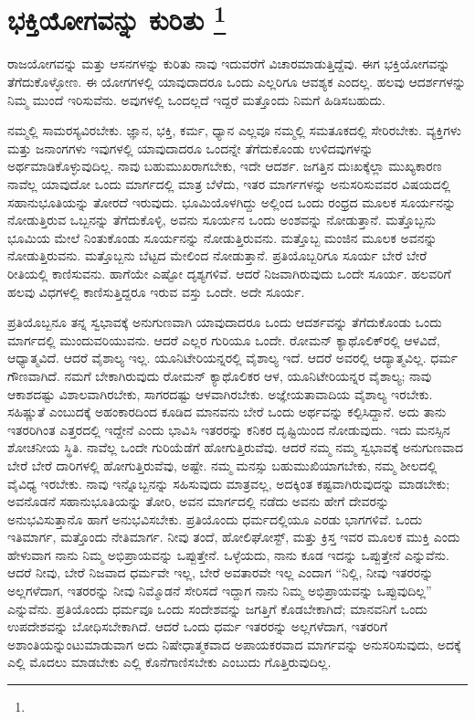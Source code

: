 
\chapter[ಭಕ್ತಿಯೋಗವನ್ನು ಕುರಿತು ]{ಭಕ್ತಿಯೋಗವನ್ನು ಕುರಿತು \protect\footnote{}}

ರಾಜಯೋಗವನ್ನು ಮತ್ತು ಆಸನಗಳನ್ನು ಕುರಿತು ನಾವು ಇದುವರೆಗೆ ವಿಚಾರಮಾಡುತ್ತಿದ್ದೆವು. ಈಗ ಭಕ್ತಿಯೋಗವನ್ನು ತೆಗೆದುಕೊಳ್ಳೋಣ. ಈ ಯೋಗಗಳಲ್ಲಿ ಯಾವುದಾದರೂ ಒಂದು ಎಲ್ಲರಿಗೂ ಆವಶ್ಯಕ ಎಂದಲ್ಲ. ಹಲವು ಆದರ್ಶಗಳನ್ನು ನಿಮ್ಮ ಮುಂದೆ ಇರಿಸುವೆನು. ಅವುಗಳಲ್ಲಿ ಒಂದಲ್ಲದೆ ಇದ್ದರೆ ಮತ್ತೊಂದು ನಿಮಗೆ ಹಿಡಿಸಬಹುದು.

ನಮ್ಮಲ್ಲಿ ಸಾಮರಸ್ಯವಿರಬೇಕು. ಜ್ಞಾನ, ಭಕ್ತಿ, ಕರ್ಮ, ಧ್ಯಾನ ಎಲ್ಲವೂ ನಮ್ಮಲ್ಲಿ ಸಮತೂಕದಲ್ಲಿ ಸೇರಿರಬೇಕು. ವ್ಯಕ್ತಿಗಳು ಮತ್ತು ಜನಾಂಗಗಳು ಇವುಗಳಲ್ಲಿ ಯಾವುದಾದರೂ ಒಂದನ್ನೇ ತೆಗೆದುಕೊಂಡು ಉಳಿದವುಗಳನ್ನು ಅರ್ಥಮಾಡಿಕೊಳ್ಳುವುದಿಲ್ಲ. ನಾವು ಬಹುಮುಖರಾಗಬೇಕು, ಇದೇ ಆದರ್ಶ. ಜಗತ್ತಿನ ದುಃಖಕ್ಕೆಲ್ಲಾ ಮುಖ್ಯಕಾರಣ ನಾವೆಲ್ಲ ಯಾವುದೋ ಒಂದು ಮಾರ್ಗದಲ್ಲಿ ಮಾತ್ರ ಬೆಳೆದು, ಇತರ ಮಾರ್ಗಗಳನ್ನು ಅನುಸರಿಸುವವರ ವಿಷಯದಲ್ಲಿ ಸಹಾನುಭೂತಿಯನ್ನು ತೋರದೆ ಇರುವುದು. ಭೂಮಿಯೊಳಗಿದ್ದು ಅಲ್ಲಿಂದ ಒಂದು ರಂಧ್ರದ ಮೂಲಕ ಸೂರ್ಯನನ್ನು ನೋಡುತ್ತಿರುವ ಒಬ್ಬನನ್ನು ತೆಗೆದುಕೊಳ್ಳಿ, ಅವನು ಸೂರ್ಯನ ಒಂದು ಅಂಶವನ್ನು ನೋಡುತ್ತಾನೆ. ಮತ್ತೊಬ್ಬನು ಭೂಮಿಯ ಮೇಲೆ ನಿಂತುಕೊಂಡು ಸೂರ್ಯನನ್ನು ನೋಡುತ್ತಿರುವನು. ಮತ್ತೊಬ್ಬ ಮಂಜಿನ ಮೂಲಕ ಅವನನ್ನು ನೋಡುತ್ತಿರುವನು. ಮತ್ತೊಬ್ಬನು ಬೆಟ್ಟದ ಮೇಲಿಂದ ನೋಡುತ್ತಾನೆ. ಪ್ರತಿಯೊಬ್ಬರಿಗೂ ಸೂರ್ಯ ಬೇರೆ ಬೇರೆ ರೀತಿಯಲ್ಲಿ ಕಾಣಿಸುವನು. ಹಾಗೆಯೇ ಎಷ್ಟೋ ದೃಶ್ಯಗಳಿವೆ. ಆದರೆ ನಿಜವಾಗಿರುವುದು ಒಂದೇ ಸೂರ್ಯ. ಹಲವರಿಗೆ ಹಲವು ವಿಧಗಳಲ್ಲಿ ಕಾಣಿಸುತ್ತಿದ್ದರೂ ಇರುವ ವಸ್ತು ಒಂದೇ. ಅದೇ ಸೂರ್ಯ.

ಪ್ರತಿಯೊಬ್ಬನೂ ತನ್ನ ಸ್ವಭಾವಕ್ಕೆ ಅನುಗುಣವಾಗಿ ಯಾವುದಾದರೂ ಒಂದು ಆದರ್ಶವನ್ನು ತೆಗೆದುಕೊಂಡು ಒಂದು ಮಾರ್ಗದಲ್ಲಿ ಮುಂದುವರಿಯುವನು. ಆದರೆ ಎಲ್ಲರ ಗುರಿಯೂ ಒಂದೇ. ರೋಮನ್​ ಕ್ಯಾಥೊಲಿಕ್​ರಲ್ಲಿ ಆಳವಿದೆ, ಆಧ್ಯಾತ್ಮವಿದೆ. ಆದರೆ ವೈಶಾಲ್ಯ ಇಲ್ಲ. ಯೂನಿಟೇರಿಯನ್ನರಲ್ಲಿ ವೈಶಾಲ್ಯ ಇದೆ. ಆದರೆ ಅವರಲ್ಲಿ ಆದ್ಯಾತ್ಮವಿಲ್ಲ. ಧರ್ಮ ಗೌಣವಾಗಿದೆ. ನಮಗೆ ಬೇಕಾಗಿರುವುದು ರೋಮನ್​ ಕ್ಯಾಥೊಲಿಕರ ಆಳ, ಯೂನಿಟೇರಿಯನ್ನರ ವೈಶಾಲ್ಯ; ನಾವು ಆಕಾಶದಷ್ಟು ವಿಶಾಲವಾಗಿರಬೇಕು, ಸಾಗರದಷ್ಟು ಆಳವಾಗಿರಬೇಕು. ಅಜ್ಞೇಯತಾವಾದಿಯ ವೈಶಾಲ್ಯ ಇರಬೇಕು. ಸಹಿಷ್ಣುತೆ ಎಂಬುದಕ್ಕೆ ಅಹಂಕಾರದಿಂದ ಕೂಡಿದ ಮಾನವನು ಬೇರೆ ಒಂದು ಅರ್ಥವನ್ನು ಕಲ್ಪಿಸಿದ್ದಾನೆ. ಅದು ತಾನು ಇತರರಿಗಿಂತ ಎತ್ತರದಲ್ಲಿ ಇದ್ದೇನೆ ಎಂದು ಭಾವಿಸಿ ಇತರರನ್ನು ಕನಿಕರ ದೃಷ್ಟಿಯಿಂದ ನೋಡುವುದು. ಇದು ಮನಸ್ಸಿನ ಶೋಚನೀಯ ಸ್ಥಿತಿ. ನಾವೆಲ್ಲ ಒಂದೇ ಗುರಿಯೆಡೆಗೆ ಹೋಗುತ್ತಿರುವೆವು. ಆದರೆ ನಮ್ಮ ನಮ್ಮ ಸ್ವಭಾವಕ್ಕೆ ಅನುಗುಣವಾದ ಬೇರೆ ಬೇರೆ ದಾರಿಗಳಲ್ಲಿ ಹೋಗುತ್ತಿರುವೆವು, ಅಷ್ಟೇ. ನಮ್ಮ ಮನಸ್ಸು ಬಹುಮುಖಿಯಾಗಬೇಕು, ನಮ್ಮ ಶೀಲದಲ್ಲಿ ವೈವಿಧ್ಯ ಇರಬೇಕು. ನಾವು ಇನ್ನೊಬ್ಬನನ್ನು ಸಹಿಸುವುದು ಮಾತ್ರವಲ್ಲ, ಅದಕ್ಕಿಂತ ಕಷ್ಟವಾಗಿರುವುದನ್ನು ಮಾಡಬೇಕು; ಅವನೊಡನೆ ಸಹಾನುಭೂತಿಯನ್ನು ತೋರಿ, ಅವನ ಮಾರ್ಗದಲ್ಲಿ ನಡೆದು ಅವನು ಹೇಗೆ ದೇವರನ್ನು ಅನುಭವಿಸುತ್ತಾನೊ ಹಾಗೆ ಅನುಭವಿಸಬೇಕು. ಪ್ರತಿಯೊಂದು ಧರ್ಮದಲ್ಲಿಯೂ ಎರಡು ಭಾಗಗಳಿವೆ. ಒಂದು ಇತಿಮಾರ್ಗ, ಮತ್ತೊಂದು ನೇತಿಮಾರ್ಗ. ನೀವು ತಂದೆ, ಹೋಲಿಘೋಸ್ಟ್​, ಮತ್ತು ಕ್ರಿಸ್ತ ಇವರ ಮೂಲಕ ಮುಕ್ತಿ ಎಂದು ಹೇಳುವಾಗ ನಾನು ನಿಮ್ಮ ಅಭಿಪ್ರಾಯವನ್ನು ಒಪ್ಪುತ್ತೇನೆ. ಒಳ್ಳೆಯದು, ನಾನು ಕೂಡ ಇದನ್ನು ಒಪ್ಪುತ್ತೇನೆ ಎನ್ನುವೆನು. ಆದರೆ ನೀವು, ಬೇರೆ ನಿಜವಾದ ಧರ್ಮವೇ ಇಲ್ಲ, ಬೇರೆ ಅವತಾರವೇ ಇಲ್ಲ ಎಂದಾಗ “ನಿಲ್ಲಿ, ನೀವು ಇತರರನ್ನು ಅಲ್ಲಗಳೆದಾಗ, ಇತರರನ್ನು ನೀವು ನಿಮ್ಮೊಡನೆ ಸೇರಿಸದೆ ಇದ್ದಾಗ ನಾನು ನಿಮ್ಮ ಅಭಿಪ್ರಾಯವನ್ನು ಒಪ್ಪುವುದಿಲ್ಲ” ಎನ್ನುವೆನು. ಪ್ರತಿಯೊಂದು ಧರ್ಮವೂ ಒಂದು ಸಂದೇಶವನ್ನು ಜಗತ್ತಿಗೆ ಕೊಡಬೇಕಾಗಿದೆ; ಮಾನವನಿಗೆ ಒಂದು ಉಪದೇಶವನ್ನು ಬೋಧಿಸಬೇಕಾಗಿದೆ. ಆದರೆ ಒಂದು ಧರ್ಮ ಇತರರನ್ನು ಅಲ್ಲಗಳೆದಾಗ, ಇತರರಿಗೆ ಅಶಾಂತಿಯನ್ನುಂಟುಮಾಡುವಾಗ ಅದು ನಿಷೇಧಾತ್ಮಕವಾದ ಅಪಾಯಕರವಾದ ಮಾರ್ಗವನ್ನು ಅನುಸರಿಸುವುದು, ಅದಕ್ಕೆ ಎಲ್ಲಿ ಮೊದಲು ಮಾಡಬೇಕು ಎಲ್ಲಿ ಕೊನೆಗಾಣಿಸಬೇಕು ಎಂಬುದು ಗೊತ್ತಿರುವುದಿಲ್ಲ.

